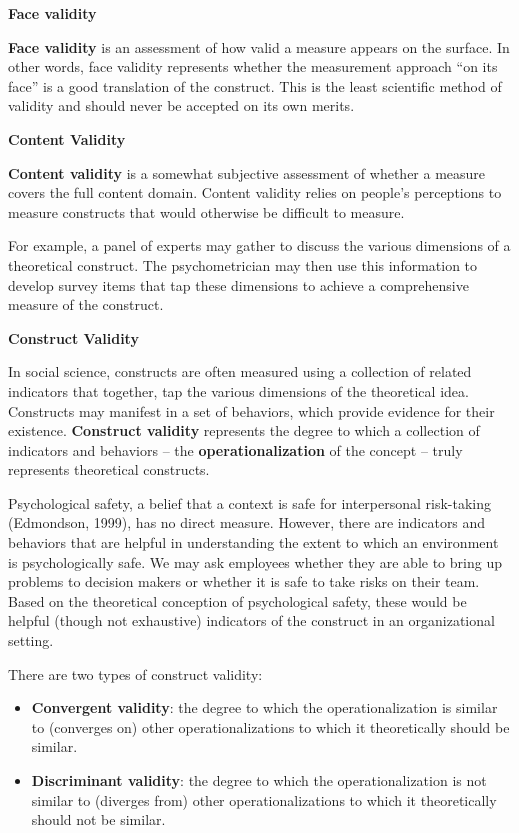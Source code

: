 \documentclass[]{book}
\providecommand{\tightlist}{%
  \setlength{\itemsep}{0pt}\setlength{\parskip}{0pt}}
\begin{document}
\textbf{Face validity}

\textbf{Face validity} is an assessment of how valid a measure appears on the surface. In other words, face validity represents whether the measurement approach ``on its face'' is a good translation of the construct. This is the least scientific method of validity and should never be accepted on its own merits.

\textbf{Content Validity}

\textbf{Content validity} is a somewhat subjective assessment of whether a measure covers the full content domain. Content validity relies on people's perceptions to measure constructs that would otherwise be difficult to measure.

For example, a panel of experts may gather to discuss the various dimensions of a theoretical construct. The psychometrician may then use this information to develop survey items that tap these dimensions to achieve a comprehensive measure of the construct.

\textbf{Construct Validity}

In social science, constructs are often measured using a collection of related indicators that together, tap the various dimensions of the theoretical idea. Constructs may manifest in a set of behaviors, which provide evidence for their existence. \textbf{Construct validity} represents the degree to which a collection of indicators and behaviors -- the \textbf{operationalization} of the concept -- truly represents theoretical constructs.

Psychological safety, a belief that a context is safe for interpersonal risk-taking (Edmondson, 1999), has no direct measure. However, there are indicators and behaviors that are helpful in understanding the extent to which an environment is psychologically safe. We may ask employees whether they are able to bring up problems to decision makers or whether it is safe to take risks on their team. Based on the theoretical conception of psychological safety, these would be helpful (though not exhaustive) indicators of the construct in an organizational setting.

There are two types of construct validity:

\begin{itemize}
\tightlist
\item
  \textbf{Convergent validity}: the degree to which the operationalization is similar to (converges on) other operationalizations to which it theoretically should be similar.
\item
  \textbf{Discriminant validity}: the degree to which the operationalization is not similar to (diverges from) other operationalizations to which it theoretically should not be similar.
\end{itemize}
\end{document}
